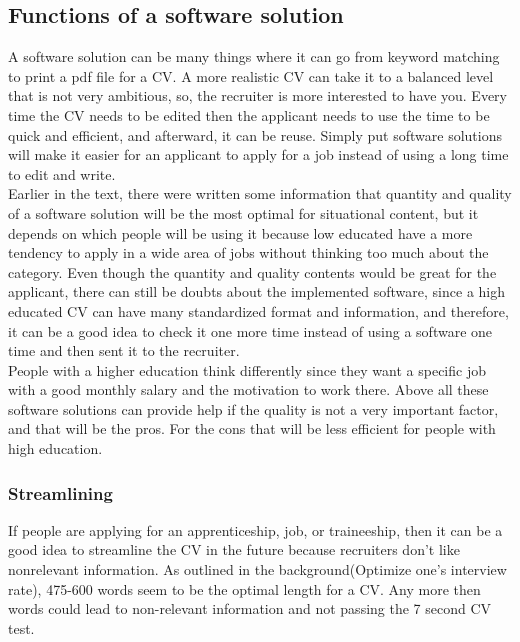 \subsection{Functions of a software solution}
A software solution can be many things where it can go from keyword matching to print a pdf file for a CV.
A more realistic CV can take it to a balanced level that is not very ambitious, 
so, the recruiter is more interested to have you. Every time the CV needs to be edited
then the applicant needs to use the time to be quick and efficient, and afterward, it can be reuse.
Simply put software solutions will make it easier for an applicant to apply for a job instead of using a long time to edit and write. \\

Earlier in the text, there were written some information 
that quantity and quality of a software solution will be the most optimal for situational content,
but it depends on which people will be using it because low educated have a more tendency to apply
in a wide area of jobs without thinking too much about the category. 
Even though the quantity and quality contents would be great for the applicant, 
there can still be doubts about the implemented software, since a high educated CV can have many standardized format and information,
and therefore, it can be a good idea to check it one more time instead of using a software one time and then sent it to the recruiter. \\

People with a higher education think differently since they want a specific job
with a good monthly salary and the motivation to work there. 
Above all these software solutions can provide help if the quality is not a very important factor,
and that will be the pros. For the cons that will be less efficient for people with high education.


\subsubsection{Streamlining}
If people are applying for an apprenticeship, job, or traineeship, 
then it can be a good idea to streamline the CV in the future because recruiters don't like nonrelevant information.
As outlined in the background(Optimize one's interview rate), 475-600 words seem to be the optimal length for a CV.
Any more then words could lead to non-relevant information and not passing the 7 second CV test. \\

